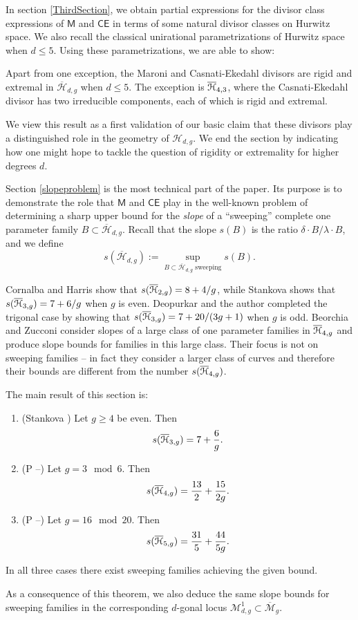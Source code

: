 \documentclass[reqno, 10 pt]{article}
\theoremstyle{definition}
\theoremstyle{remark}
\numberwithin{equation}{section}
\numberwithin{thm}{section}
\numberwithin{prop}{section}
\numberwithin{lem}{section}
\numberwithin{cor}{section}
\numberwithin{conj}{section}
\numberwithin{defn}{section}
\renewcommand{\H}{\mathcal H}
\newcommand{\Hdg}{\overline{\H}_{d,g}}
\newcommand{\sfCE}{{\mathsf {CE}}}
\newcommand{\sfM}{{\mathsf M}}
\newcommand{\Mg}{{\overline{\mathcal{M}}_{g}}}
\newcommand{\cM}{{\mathcal M}}
\renewcommand{\H}{{\mathcal{H}}}
\begin{document}
In section \autoref{ThirdSection}, we obtain partial expressions for the divisor class expressions of $\sfM$ and $\sfCE$ in terms of some natural divisor classes on Hurwitz space.  We also recall the classical unirational parametrizations of Hurwitz space when $d \leq 5$.  Using these parametrizations, we are able to show: 

\begin{maintheorem}\label{rigidityextremality} Apart from one exception, the Maroni and Casnati-Ekedahl divisors are rigid and extremal in $\Hdg$ when $d \leq 5$.  The exception is $\o{\H}_{4,3}$, where the Casnati-Ekedahl divisor has two irreducible components, each of which is rigid and extremal.
\end{maintheorem} 
We view this result as a first validation of our basic claim that these divisors play a distinguished role in the geometry of $\H_{d,g}$. We end the section by indicating how one might hope to tackle the question of rigidity or extremality for higher degrees $d$. 

Section \autoref{slopeproblem} is the most technical part of the paper. Its purpose is to demonstrate the role that $\sfM$ and $\sfCE$ play in the well-known problem of determining a sharp upper bound for the {\sl slope} of a ``sweeping''  complete one parameter family $B \subset \Hdg$. Recall that the slope $s(B)$ is the ratio $\delta \cdot B/ \lambda \cdot B$, and we define $$s(\Hdg) := \sup_{\text{$B \subset \Hdg$ sweeping}} s(B).$$

Cornalba and Harris \cite{cornalba88:_divis} show that $s(\o{\H}_{2,g}) = 8 + 4/g$, while Stankova \cite{stankova} shows that $s(\o{\H}_{3,g}) = 7 + 6/g$ when $g$ is even.  Deopurkar and the author \cite{deopurkar_patel:sharp_trigonal} completed the trigonal case by showing that $s(\o{\H}_{3,g}) = 7 + 20/(3g+1)$ when $g$ is odd. 
Beorchia and Zucconi \cite{beorchia12} consider slopes of a large class of one parameter families in $\o{\H}_{4,g}$ and produce slope bounds for families in this large class.  Their focus is not on sweeping families -- in fact they consider a larger class of curves and therefore their bounds are different from the number $s(\o{\H}_{4,g})$.  

The main result of this section is:
\begin{maintheorem} \label{slope45}

\begin{enumerate}
\item (Stankova \cite{stankova}) Let $g \geq 4$ be even. Then \[s(\o{\H}_{3,g}) = 7 + \frac{6}{g}.\]
\item (P --) Let $g = 3 \mod  6$. Then \[s(\o{\H}_{4,g}) = \frac{13}{2} + \frac{15}{2g}.\] 
\item (P --) Let $g = 16 \mod 20$.  Then \[s(\o{\H}_{5,g}) = \frac{31}{5} + \frac{44}{5g}.\] 
\end{enumerate}

In all three cases there exist sweeping families achieving the given bound.
\end{maintheorem}
As a consequence of this theorem, we also deduce the same slope bounds for sweeping families in the corresponding $d$-gonal locus $\cM^{1}_{d,g} \subset \Mg$.
\end{document}
